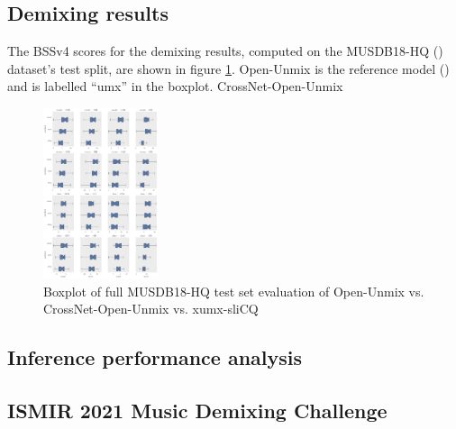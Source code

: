 \documentclass[report.tex]{subfiles}
\begin{document}
\subsection{Demixing results}

The BSSv4 scores for the demixing results, computed on the MUSDB18-HQ (\cite{musdb18hq}) dataset's test split, are shown in figure \ref{fig:bssboxplot}. Open-Unmix is the reference model (\cite{umx}) and is labelled ``umx'' in the boxplot. CrossNet-Open-Unmix 

\begin{figure}[ht]
	\centering
	\includegraphics[height=5cm]{./images-bss/boxplot_full.png}
	\caption{Boxplot of full MUSDB18-HQ test set evaluation of Open-Unmix vs. CrossNet-Open-Unmix vs. xumx-sliCQ}
	\label{fig:bssboxplot}
\end{figure}

\subsection{Inference performance analysis}

\subsection{ISMIR 2021 Music Demixing Challenge}

\end{document}
